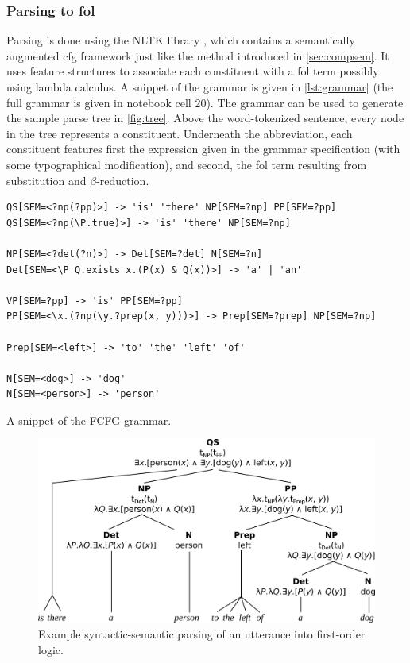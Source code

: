 \subsubsection{Parsing to \gls{fol}}

Parsing is done using the NLTK library \citep{nltk}, which contains a semantically augmented \gls{cfg} framework just like the method introduced in \autoref{sec:compsem}.
It uses feature structures to associate each constituent with a \gls{fol} term possibly using lambda calculus.
A snippet of the grammar is given in \autoref{lst:grammar} (the full grammar is given in notebook cell 20).
The grammar can be used to generate the sample parse tree in \autoref{fig:tree}.
Above the word-tokenized sentence, every node in the tree represents a constituent.
Underneath the abbreviation, each constituent features first the expression given in the grammar specification (with some typographical modification), and second, the \gls{fol} term resulting from substitution and $\beta$-reduction.

\begin{listing}
\begin{lstlisting}[label={lst:grammar}]
QS[SEM=<?np(?pp)>] -> 'is' 'there' NP[SEM=?np] PP[SEM=?pp]
QS[SEM=<?np(\P.true)>] -> 'is' 'there' NP[SEM=?np]

NP[SEM=<?det(?n)>] -> Det[SEM=?det] N[SEM=?n]
Det[SEM=<\P Q.exists x.(P(x) & Q(x))>] -> 'a' | 'an'

VP[SEM=?pp] -> 'is' PP[SEM=?pp]
PP[SEM=<\x.(?np(\y.?prep(x, y)))>] -> Prep[SEM=?prep] NP[SEM=?np]

Prep[SEM=<left>] -> 'to' 'the' 'left' 'of'

N[SEM=<dog>] -> 'dog'
N[SEM=<person>] -> 'person'
\end{lstlisting}
\caption{A snippet of the FCFG grammar.}
\end{listing}

\begin{figure}[h]
\includegraphics[width=\textwidth]{tree}
\centering
\caption{Example syntactic-semantic parsing of an utterance into first-order logic.}
\label{fig:tree}
\end{figure}



